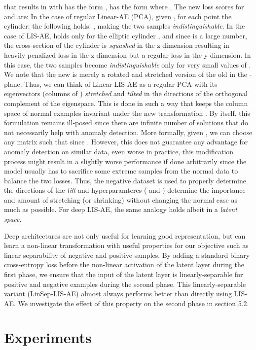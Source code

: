 \documentclass[acmtog, nonacm]{acmart}
\begin{document}
that results in 
 with 
 has the form ,
 has the form  where . The new loss scores for  and  are: 
\noindent
In the case of regular Linear-AE (PCA), given , for each point  the cylinder:  the following holds: , making the two samples \textit{indistinguishable}. 
In the case of LIS-AE,  holds only for the elliptic cylinder , and since  is a large number, the cross-section of the cylinder is \textit{squashed} in the z dimension resulting in heavily penalized loss in the z dimension but a regular loss in the y dimension. In this case, the two samples become \textit{indistinguishable} only for very small values of .\\
We note that the new  is merely a rotated and stretched version of the old  in the -plane. Thus, we can think of Linear LIS-AE as a regular PCA with its eigenvectors (columns of ) \textit{stretched} and \textit{tilted} in the directions of the orthogonal complement of the eigenspace. This is done in such a way that keeps the column space of normal examples invariant under the new transformation . By itself, this formulation remains ill-posed since there are infinite number of solutions that do not necessarily help with anomaly detection. More formally, given , we can choose any matrix  such that  since . However, this does not guarantee any advantage for anomaly detection on similar data, even worse in practice, this modification process might result in a slightly worse performance if done arbitrarily since  the model usually has to sacrifice some extreme samples from the normal data to balance the two losses. Thus, the negative dataset is used to properly determine the directions of the \textit{tilt} and hyperparamteres ( and ) determine the importance and amount of stretching (or shrinking) without changing the normal case as much as possible. For deep LIS-AE, the same analogy holds albeit in a \textit{latent space}.

Deep architectures are not only useful for learning good representation, but can learn a non-linear transformation with useful properties for our objective such as linear separability of negative and positive samples. By adding a standard binary cross-entropy loss before the non-linear activation of the latent layer during the first phase, we ensure that the input of the latent layer is linearly-separable for positive and negative examples during the second phase. This linearly-separable variant (LinSep-LIS-AE) almost always performs better than directly using LIS-AE. We investigate the effect of this property on the second phase in section 5.2.
\section{Experiments}
\end{document}
